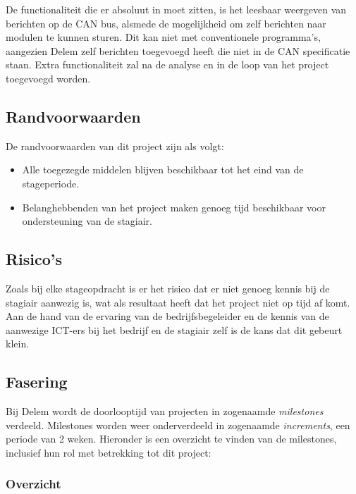 De functionaliteit die er absoluut in moet zitten, is het leesbaar weergeven van berichten op de CAN bus, alsmede de mogelijkheid om zelf berichten naar modulen te kunnen sturen. Dit kan niet met conventionele programma's, aangezien Delem zelf berichten toegevoegd heeft die niet in de CAN specificatie staan. Extra functionaliteit zal na de analyse en in de loop van het project toegevoegd worden.

\subsection{Randvoorwaarden}

De  randvoorwaarden van dit project zijn als volgt:

\begin{itemize}
\item Alle toegezegde middelen blijven beschikbaar tot het eind van de stageperiode.
\item Belanghebbenden van het project maken genoeg tijd beschikbaar voor ondersteuning van de stagiair.
\end{itemize}

\subsection{Risico's}

Zoals bij elke stageopdracht is er het risico dat er niet genoeg kennis bij de stagiair aanwezig is, wat als resultaat heeft dat het project niet op tijd af komt. Aan de hand van de ervaring van de bedrijfsbegeleider en de kennis van de aanwezige ICT-ers bij het bedrijf en de stagiair zelf is de kans dat dit gebeurt klein.

\subsection{Fasering}

\label{fasering}

Bij Delem wordt de doorlooptijd van projecten in zogenaamde \emph{milestones} verdeeld. Milestones worden weer onderverdeeld in zogenaamde \emph{increments}, een periode van 2 weken. Hieronder is een overzicht te vinden van de milestones, inclusief hun rol met betrekking tot dit project:

\newpage
\subsubsection{Overzicht}

